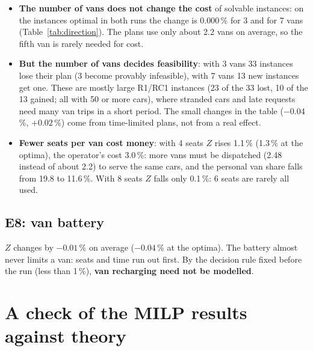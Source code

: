 \begin{itemize}
  \item \textbf{The number of vans does not change the cost} of solvable instances: on the instances optimal in both runs the change is 0.000\,\% for 3 and for 7 vans (Table~\ref{tab:direction}). The plans use only about 2.2 vans on average, so the fifth van is rarely needed for cost.
  \item \textbf{But the number of vans decides feasibility}: with 3 vans 33 instances lose their plan (3 become provably infeasible), with 7 vans 13 new instances get one. These are mostly large R1/RC1 instances (23 of the 33 lost, 10 of the 13 gained; all with 50 or more cars), where stranded cars and late requests need many van trips in a short period. The small changes in the table ($-0.04$\,\%, $+0.02$\,\%) come from time-limited plans, not from a real effect.
  \item \textbf{Fewer seats per van cost money}: with 4 seats $Z$ rises 1.1\,\% (1.3\,\% at the optima), the operator's cost 3.0\,\%: more vans must be dispatched (2.48 instead of about 2.2) to serve the same cars, and the personal van share falls from 19.8 to 11.6\,\%. With 8 seats $Z$ falls only 0.1\,\%: 6 seats are rarely all used.
\end{itemize}


\subsection{E8: van battery}

\begin{table}[H]
\centering
\caption{E8. Van battery 200 kWh instead of 150.}

\end{table}

$Z$ changes by $-0.01$\,\% on average ($-0.04$\,\% at the optima). The battery almost never limits a van: seats and time run out first. By the decision rule fixed before the run (less than 1\,\%), \textbf{van recharging need not be modelled}.


\section{A check of the MILP results against theory}
\label{sec:direction}


